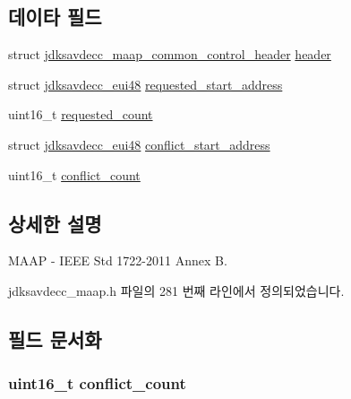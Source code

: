 \subsection*{데이타 필드}
\begin{DoxyCompactItemize}
\item 
struct \hyperlink{structjdksavdecc__maap__common__control__header}{jdksavdecc\+\_\+maap\+\_\+common\+\_\+control\+\_\+header} \hyperlink{structjdksavdecc__maap_a14c416d0f59ebb809de1ab5889e4cd06}{header}
\item 
struct \hyperlink{structjdksavdecc__eui48}{jdksavdecc\+\_\+eui48} \hyperlink{structjdksavdecc__maap_a89e8561b4567080302ee157bb8d1e6c6}{requested\+\_\+start\+\_\+address}
\item 
uint16\+\_\+t \hyperlink{structjdksavdecc__maap_a3b7ca808f59412368434591249aa8a79}{requested\+\_\+count}
\item 
struct \hyperlink{structjdksavdecc__eui48}{jdksavdecc\+\_\+eui48} \hyperlink{structjdksavdecc__maap_a8e207eea768f9c09349717e706b65a3b}{conflict\+\_\+start\+\_\+address}
\item 
uint16\+\_\+t \hyperlink{structjdksavdecc__maap_a7454bb2b51c745c38822d008f1a322a1}{conflict\+\_\+count}
\end{DoxyCompactItemize}


\subsection{상세한 설명}
M\+A\+AP -\/ I\+E\+EE Std 1722-\/2011 Annex B. 

jdksavdecc\+\_\+maap.\+h 파일의 281 번째 라인에서 정의되었습니다.



\subsection{필드 문서화}
\subsubsection[{\texorpdfstring{conflict\+\_\+count}{conflict_count}}]{\setlength{\rightskip}{0pt plus 5cm}uint16\+\_\+t conflict\+\_\+count}\hypertarget{structjdksavdecc__maap_a7454bb2b51c745c38822d008f1a322a1}{}\label{structjdksavdecc__maap_a7454bb2b51c745c38822d008f1a322a1}


